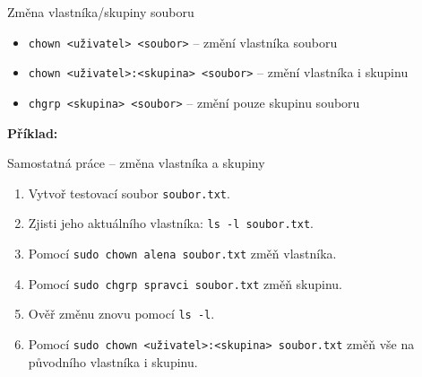 \documentclass{beamer}
\begin{document}
\begin{frame}[fragile]{Změna vlastníka/skupiny souboru}
	\begin{itemize}
		\item \texttt{chown <uživatel> <soubor>} – změní vlastníka souboru
		\item \texttt{chown <uživatel>:<skupina> <soubor>} – změní vlastníka i skupinu
		\item \texttt{chgrp <skupina> <soubor>} – změní pouze skupinu souboru
	\end{itemize}
	
		\vspace{1.5em}
	\textbf{Příklad:}
\end{frame}

\begin{frame}{Samostatná práce – změna vlastníka a skupiny}
	\small
	\begin{enumerate}
		\item Vytvoř testovací soubor \texttt{soubor.txt}.
		\item Zjisti jeho aktuálního vlastníka: \texttt{ls -l soubor.txt}.
		\item Pomocí \texttt{sudo chown alena soubor.txt} změň vlastníka.
		\item Pomocí \texttt{sudo chgrp spravci soubor.txt} změň skupinu.
		\item Ověř změnu znovu pomocí \texttt{ls -l}.
		\item Pomocí \texttt{sudo chown <uživatel>:<skupina> soubor.txt} změň vše na původního vlastníka i skupinu.
	\end{enumerate}
\end{frame}
\end{document}

